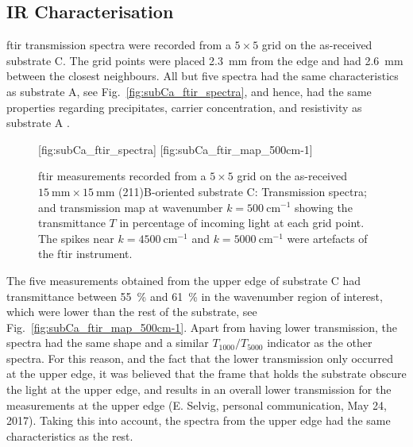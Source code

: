 \subsection{IR Characterisation}

\Ac{ftir} transmission spectra were recorded from a $5\times5$ grid on the as-received substrate C. The grid points were placed \SI{2.3}{\milli\metre} from the edge and had \SI{2.6}{\milli\metre} between the closest neighbours. All but five spectra had the same characteristics as substrate A, see Fig.~\ref{fig:subCa_ftir_spectra}, and hence, had the same properties regarding precipitates, carrier concentration, and resistivity as substrate A \citep{yujie2004infrared}.

\begin{figure}[htbp]
    \centering
    [fig:subCa_ftir_spectra]
    \hfill
    [fig:subCa_ftir_map_500cm-1]
    \caption[\Ac{ftir} measurements of the as-received substrate C.]{\Ac{ftir} measurements recorded from a $5\times5$ grid on the as-received $\SI{15}{\milli\metre}\times\SI{15}{\milli\metre}$ (211)B-oriented substrate C:  Transmission spectra; and  transmission map at wavenumber $k=\SI{500}{\centi\metre^{-1}}$ showing the transmittance $T$ in percentage of incoming light at each grid point. The spikes near $k=\SI{4500}{\centi\metre^{-1}}$ and $k=\SI{5000}{\centi\metre^{-1}}$ were artefacts of the \ac{ftir} instrument.}
\end{figure}

The five measurements obtained from the upper edge of substrate C had transmittance between \SI{55}{\percent} and \SI{61}{\percent} in the wavenumber region of interest, which were lower than the rest of the substrate, see Fig.~\ref{fig:subCa_ftir_map_500cm-1}. Apart from having lower transmission, the spectra had the same shape and a similar $T_{1000}/T_{5000}$ indicator as the other spectra. For this reason, and the fact that the lower transmission only occurred at the upper edge, it was believed that the frame that holds the substrate obscure the light at the upper edge, and results in an overall lower transmission for the measurements at the upper edge (E. Selvig, personal communication, May 24, 2017). Taking this into account, the spectra from the upper edge had the same characteristics as the rest.



